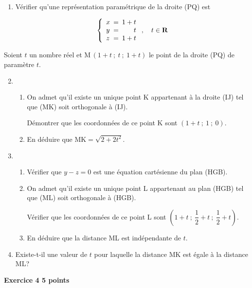 \documentclass[10pt,a4paper]{article}
\newcommand{\R}{\textbf{R}}
\newcommand{\ds}{\displaystyle}
\begin{document}
\begin{enumerate}
\item Vérifier qu'une représentation paramétrique de la droite (PQ) est

\[\left \lbrace
\begin{array}{l !{=} r}
x& 1+t\\
y & t \\
z & 1+t\\
\end{array}
\right . ,\quad t\in\R\]

\end{enumerate}

Soient $t$ un nombre réel et M\,$(1+t~;~t~;~1+t)$ le point de la droite (PQ) de paramètre $t$.

\begin{enumerate}
\setcounter{enumi}{1}
\item 
\begin{enumerate}
\item On admet qu'il existe un unique point K appartenant à la droite (IJ) tel que (MK) soit orthogonale à (IJ).

Démontrer que les coordonnées de ce point K sont $(1+t~;~1~;~0)$.
\item En déduire que $\text{MK} = \ds\sqrt{2+2t^2}$.
\end{enumerate}

\item
	\begin{enumerate}
		\item Vérifier que $y-z=0$ est une équation cartésienne du plan (HGB).
		\item On admet qu'il existe un unique point L appartenant au plan (HGB) tel que (ML) soit orthogonale à (HGB).

\smallskip

Vérifier que les coordonnées de ce  point L sont $\left (1+t~;~\dfrac{1}{2}+t~;~\dfrac{1}{2}+t\right )$.
		\item En déduire que la distance ML est indépendante de $t$.
	\end{enumerate}
\item Existe-t-il une valeur de $t$ pour laquelle la distance MK est égale à la distance ML?
\end{enumerate}

\vspace{0,25cm}

\textbf{Exercice 4 \hfill 5 points}

\medskip
\end{document}
